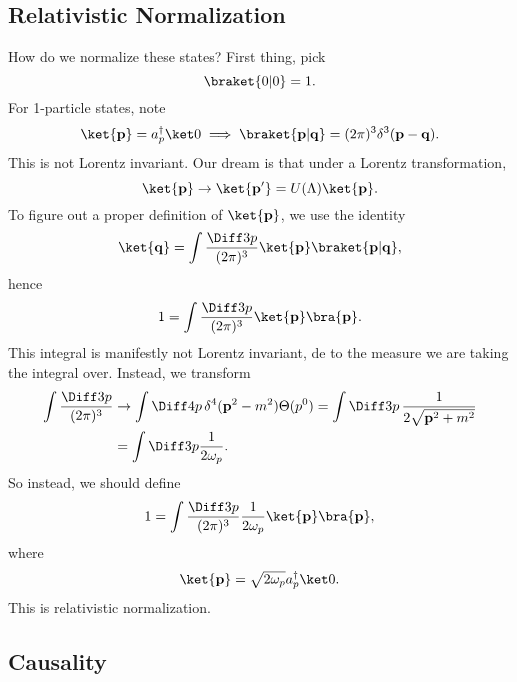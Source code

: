\documentclass[12pt]{article}
\begin{document}
\subsection{Relativistic Normalization}%
\label{sub:rn}

How do we normalize these states? First thing, pick
\[
	\braket{0|0} = 1.
\]
For 1-particle states, note
\[
	\ket{\mathbf{p}} = a_p^\dagger \ket 0 \implies \braket{\mathbf{p}|\mathbf{q}} = (2\pi)^3 \delta^3(\mathbf{p} - \mathbf{q}).
\]
This is not Lorentz invariant. Our dream is that under a Lorentz transformation,
\[
	\ket{\mathbf{p}} \to \ket{\mathbf{p}'} = U(\Lambda) \ket{\mathbf{p}}.
\]
To figure out a proper definition of $\ket{\mathbf{p}}$, we use the identity
\[
	\ket{\mathbf{q}}=  \int \frac{\Diff3p}{(2\pi)^3} \ket{\mathbf{p}} \braket{\mathbf{p}|\mathbf{q}},
\]
hence
\[
	1 = \int \frac{\Diff3p}{(2\pi)^3} \ket{\mathbf{p}}\bra{\mathbf{p}}.
\]
This integral is manifestly not Lorentz invariant, de to the measure we are taking the integral over. Instead, we transform
\begin{align*}
	\int \frac{\Diff3p}{(2\pi)^3} &\to \int \Diff4p \, \delta^{4}(\mathbf{p}^2-m^2) \Theta(p^0) = \int \Diff3p\, \frac{1}{2\sqrt{\mathbf{p}^2 + m^2}} \\
				      &= \int \Diff3 p \frac{1}{2 \omega_p}.
\end{align*}
So instead, we should define
\[
	1 = \int \frac{\Diff3p}{(2\pi)^3} \frac{1}{2\omega_p} \ket{\mathbf{p}}\bra{\mathbf{p}},
\]
where
\[
	\ket{\mathbf{p}} = \sqrt{2\omega_p} a_p^\dagger \ket 0.
\]
This is relativistic normalization.

\subsection{Causality}%
\label{sub:cause}
\end{document}
